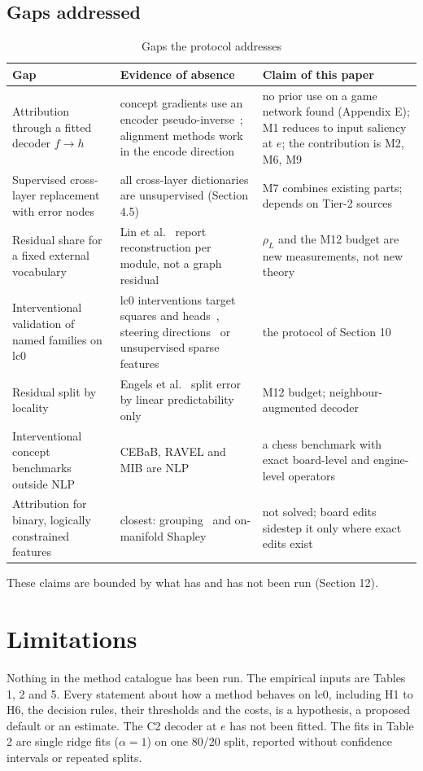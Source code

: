 \documentclass[conference]{IEEEtran}
\begin{document}
\subsection{Gaps addressed}\label{sec:11.4}
\begin{table}[!t]
\centering
\renewcommand{\thetable}{6}
\caption{Gaps the protocol addresses}
\label{tab:6}
\footnotesize
\begin{tabularx}{\textwidth}{>{\raggedright\arraybackslash}X>{\raggedright\arraybackslash}X>{\raggedright\arraybackslash}X}
\toprule
Gap & Evidence of absence & Claim of this paper \\
\midrule
Attribution through a fitted decoder $f\to h$ & concept gradients use an encoder pseudo-inverse~\cite{bai2023}; alignment methods work in the encode direction & no prior use on a game network found (Appendix E); M1 reduces to input saliency at $e$; the contribution is M2, M6, M9 \\
Supervised cross-layer replacement with error nodes & all cross-layer dictionaries are unsupervised (Section 4.5) & M7 combines existing parts; depends on Tier-2 sources \\
Residual share for a fixed external vocabulary & Lin et al.~\cite{lin2026} report reconstruction per module, not a graph residual & $\rho_L$ and the M12 budget are new measurements, not new theory \\
Interventional validation of named families on lc0 & lc0 interventions target squares and heads~\cite{jenner2024}, steering directions~\cite{sandmann2025} or unsupervised sparse features~\cite{lin2026} & the protocol of Section 10 \\
Residual split by locality & Engels et al.~\cite{engels2025} split error by linear predictability only & M12 budget; neighbour-augmented decoder \\
Interventional concept benchmarks outside NLP & CEBaB, RAVEL and MIB are NLP & a chess benchmark with exact board-level and engine-level operators \\
Attribution for binary, logically constrained features & closest: grouping~\cite{aas2021} and on-manifold Shapley~\cite{frye2021} & not solved; board edits sidestep it only where exact edits exist \\
\bottomrule
\end{tabularx}
\end{table}

These claims are bounded by what has and has not been run (Section 12).

\section{Limitations}\label{sec:12}
Nothing in the method catalogue has been run. The empirical inputs are Tables 1, 2 and 5. Every statement about how a method behaves on lc0, including H1 to H6, the decision rules, their thresholds and the costs, is a hypothesis, a proposed default or an estimate. The C2 decoder at $e$ has not been fitted. The fits in Table 2 are single ridge fits ($\alpha=1$) on one 80/\allowbreak{}20 split, reported without confidence intervals or repeated splits.
\end{document}
